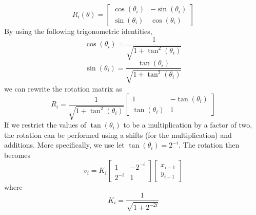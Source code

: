 \begin{equation}
R_{i}(\theta) = \begin{bmatrix} \cos(\theta_{i}) & -\sin(\theta_{i}) \\ \sin(\theta_{i}) & \cos(\theta_{i})\end{bmatrix}
\end{equation}
By using the following trigonometric identities,
\begin{equation}
\cos(\theta_{i}) =  {\frac{1}{\sqrt{1 + \tan^2(\theta_{i})}}}
\end{equation}
\begin{equation}
\sin(\theta_{i})  =  \frac{\tan(\theta_{i})}{\sqrt{1 + \tan^2(\theta_{i})}}
\end{equation}
we can rewrite the rotation matrix as
\begin{equation}
R_i = \frac{1}{\sqrt{1 + \tan^2(\theta_i)}} \begin{bmatrix} 1 & -\tan(\theta_i) \\ \tan(\theta_i) & 1 \end{bmatrix}
\end{equation}
If we restrict the values of $\tan(\theta_i)$ to be a multiplication by a factor of two, the rotation can be performed using a shifts (for the multiplication) and additions. More specifically, we use let $\tan(\theta_i) = 2^{-i}$. The rotation then becomes 
\begin{equation}
v_i = K_i \begin{bmatrix} 1 & - 2^{-i} \\  2^{-i} & 1 \end{bmatrix} \begin{bmatrix} x_{i-1} \\ y_{i-1} \end{bmatrix}
\end{equation}
where
\begin{equation}
K_i = \frac{1}{\sqrt{1 + 2^{-2i}}}
\end{equation}

